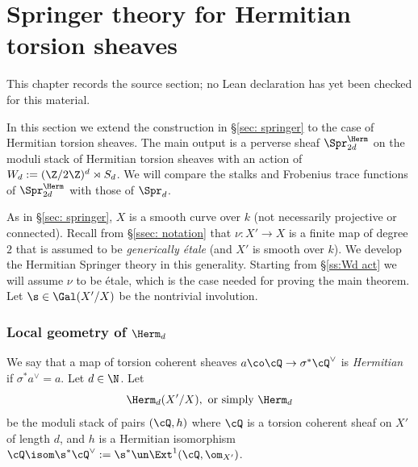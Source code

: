 \chapter{Springer theory for Hermitian torsion sheaves}
\label{higher-siegel-weil-unitary-nonsingular-terms-chapter-04}

\begin{remark}
\label{higher-siegel-weil-unitary-nonsingular-terms-chapter-04-source}
This chapter records the source section; no Lean declaration has yet been checked for this material.
\notready
\end{remark}

\label{sec: Herm}%

In this section we extend the construction in \S\ref{sec: springer} to the case of Hermitian torsion sheaves. The main output is a perverse sheaf $\Spr^{\Herm}_{2d}$ on the moduli stack of Hermitian torsion sheaves with an action of $W_{d}:=(\Z/2\Z)^{d}\rtimes S_{d}$. We will compare the stalks and Frobenius trace functions of $\Spr^{\Herm}_{2d}$ with those of $\Spr_{d}$.


As in \S\ref{sec: springer}, $X$ is a smooth curve over $k$ (not necessarily projective or connected). Recall from \S \ref{ssec: notation} that $\nu: X'\to X$ is a finite map of degree $2$ that is assumed to be {\em generically  \'etale} (and $X'$ is smooth over $k$). We develop the Hermitian  Springer theory in this generality.  Starting from \S\ref{ss:Wd act} we will assume $\nu$ to be \'etale, which is the case needed for proving the main theorem. Let $\s\in\Gal(X'/X)$ be the nontrivial involution.

\subsection{Local geometry of $\Herm_{d}$}\label{ss:Herm}
We say that a map of torsion coherent sheaves $a \co \cQ \rightarrow \sigma^* \cQ^\vee$ is \emph{Hermitian} if $\sigma^* a^\vee= a$.
Let $d\in \N$. Let
\begin{equation*}
\Herm_{d}(X'/X), \textup{ or simply } \Herm_{d}
\end{equation*}
be the moduli stack of pairs $(\cQ,h)$ where $\cQ$ is a torsion coherent sheaf on $X'$ of length $d$, and $h$ is a Hermitian isomorphism $\cQ\isom \s^{*}\cQ^{\vee}:=\s^{*}\un\Ext^{1}(\cQ,\om_{X'})$.

